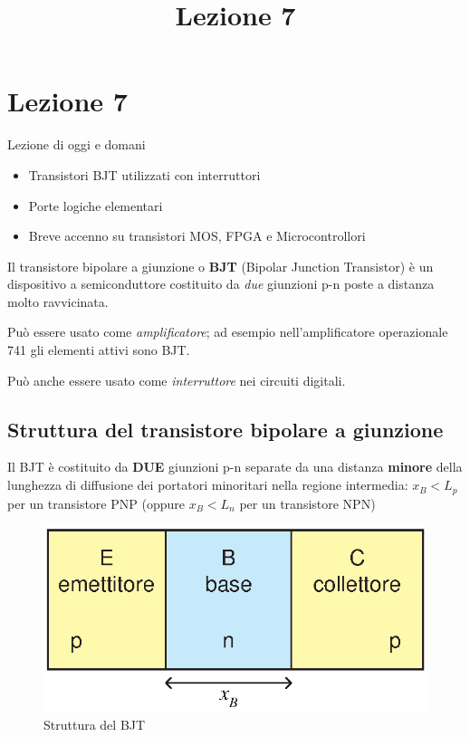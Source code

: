 \documentclass[10pt,a4paper,twoside,twocolumn]{article}
\begin{document}
\selectfont %
\title{Lezione 7}

\section{Lezione 7}

\vspace{.3cm}




\begin{paperbox}{Lezione di oggi e domani}
\begin{itemize}
\item Transistori BJT utilizzati con interruttori
\item Porte logiche elementari
\item Breve accenno su transistori MOS, FPGA e Microcontrollori
\end{itemize}
\end{paperbox}

Il transistore bipolare a  giunzione o
{\bf\color{red}BJT \color{black}} (\color{red}B\color{black}ipolar \color{red}J\color{black}unction \color{red}T\color{black}ransistor)
\`e un dispositivo a semiconduttore costituito da \emph{due} giunzioni p-n poste a distanza molto ravvicinata.

Pu\`o essere usato come \emph{amplificatore}; ad esempio nell'amplificatore operazionale 741 gli elementi attivi sono BJT.

Pu\`o anche essere usato come \emph{interruttore} nei circuiti digitali.


\subsection{Struttura del transistore bipolare a giunzione}
Il BJT \`e costituito da \textbf{DUE} giunzioni p-n 
separate da una distanza \textbf{minore} della lunghezza 
di diffusione dei portatori minoritari nella regione intermedia: 
$x_B < L_p$ per un transistore PNP (oppure $x_B < L_n$ per un transistore NPN)
\begin{figure}[h]
\centering
\includegraphics[width=0.6\columnwidth]{bjt1.eps}
\caption{Struttura del BJT}
\label{bjt1}
\end{figure}
\end{document}
